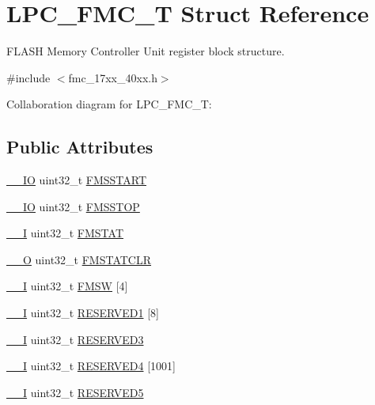 \hypertarget{structLPC__FMC__T}{}\section{L\+P\+C\+\_\+\+F\+M\+C\+\_\+T Struct Reference}
\label{structLPC__FMC__T}


F\+L\+A\+SH Memory Controller Unit register block structure.  




{\ttfamily \#include $<$fmc\+\_\+17xx\+\_\+40xx.\+h$>$}



Collaboration diagram for L\+P\+C\+\_\+\+F\+M\+C\+\_\+T\+:
\subsection*{Public Attributes}
\begin{DoxyCompactItemize}
\item 
\hyperlink{core__cm3_8h_aec43007d9998a0a0e01faede4133d6be}{\+\_\+\+\_\+\+IO} uint32\+\_\+t \hyperlink{structLPC__FMC__T_a9b3295a45c90bcabe879ace3d0de0ef8}{F\+M\+S\+S\+T\+A\+RT}
\item 
\hyperlink{core__cm3_8h_aec43007d9998a0a0e01faede4133d6be}{\+\_\+\+\_\+\+IO} uint32\+\_\+t \hyperlink{structLPC__FMC__T_a3d484fa5da4d1e27addf19ad43b338ac}{F\+M\+S\+S\+T\+OP}
\item 
\hyperlink{core__cm3_8h_af63697ed9952cc71e1225efe205f6cd3}{\+\_\+\+\_\+I} uint32\+\_\+t \hyperlink{structLPC__FMC__T_a0ecee36dd102cfd5d4eeb3113fbf508a}{F\+M\+S\+T\+AT}
\item 
\hyperlink{core__cm3_8h_a7e25d9380f9ef903923964322e71f2f6}{\+\_\+\+\_\+O} uint32\+\_\+t \hyperlink{structLPC__FMC__T_a5cb3139486ee475934461686aa247ef5}{F\+M\+S\+T\+A\+T\+C\+LR}
\item 
\hyperlink{core__cm3_8h_af63697ed9952cc71e1225efe205f6cd3}{\+\_\+\+\_\+I} uint32\+\_\+t \hyperlink{structLPC__FMC__T_a00273f3f32e8eeff8dd8e384ef2c8199}{F\+M\+SW} \mbox{[}4\mbox{]}
\item 
\hyperlink{core__cm3_8h_af63697ed9952cc71e1225efe205f6cd3}{\+\_\+\+\_\+I} uint32\+\_\+t \hyperlink{structLPC__FMC__T_a17b10ffb216f33f76e0984f1bb97c3dd}{R\+E\+S\+E\+R\+V\+E\+D1} \mbox{[}8\mbox{]}
\item 
\hyperlink{core__cm3_8h_af63697ed9952cc71e1225efe205f6cd3}{\+\_\+\+\_\+I} uint32\+\_\+t \hyperlink{structLPC__FMC__T_a75dead6dac33f1333655320d02576d6e}{R\+E\+S\+E\+R\+V\+E\+D3}
\item 
\hyperlink{core__cm3_8h_af63697ed9952cc71e1225efe205f6cd3}{\+\_\+\+\_\+I} uint32\+\_\+t \hyperlink{structLPC__FMC__T_a3562f9575288974c373fd78283ac56a1}{R\+E\+S\+E\+R\+V\+E\+D4} \mbox{[}1001\mbox{]}
\item 
\hyperlink{core__cm3_8h_af63697ed9952cc71e1225efe205f6cd3}{\+\_\+\+\_\+I} uint32\+\_\+t \hyperlink{structLPC__FMC__T_a374b0f7e9083f242ad88ed5e83202636}{R\+E\+S\+E\+R\+V\+E\+D5}
\end{DoxyCompactItemize}


